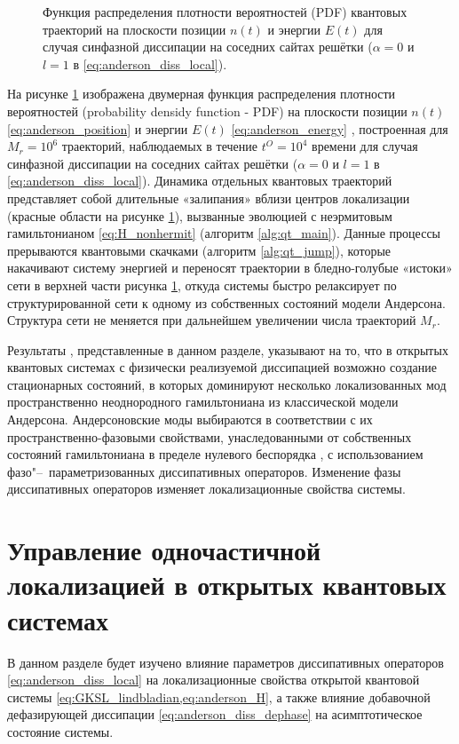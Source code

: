 \begin{figure}[ht]
	\caption[Плотность вероятностей квантовых траекторий на плоскости позиции и энергий в случае  локализации Андерсона]{
		Функция распределения плотности вероятностей (PDF) квантовых траекторий на плоскости позиции \(n(t)\) и энергии \(E(t)\) для случая синфазной диссипации на соседних сайтах решётки (\(\alpha=0\) и \(l=1\) в \cref{eq:anderson_diss_local}).
	}
	\label{fig:anderson_qj_1}
\end{figure}

На рисунке \cref{fig:anderson_qj_1} изображена двумерная функция распределения плотности вероятностей (probability densidy function - PDF) на плоскости позиции \(n(t)\) \cref{eq:anderson_position} и энергии \(E(t)\) \cref{eq:anderson_energy} , построенная для \(M_r=10^6\) траекторий, наблюдаемых в течение \(t^O=10^4\) времени для случая синфазной диссипации на соседних сайтах решётки (\(\alpha=0\) и \(l=1\) в \cref{eq:anderson_diss_local}). Динамика отдельных квантовых траекторий представляет собой длительные «залипания» вблизи центров локализации (красные области на рисунке \cref{fig:anderson_qj_1}), вызванные эволюцией с неэрмитовым гамильтонианом \cref{eq:H_nonhermit} (алгоритм \ref{alg:qt_main}). Данные процессы прерываются квантовыми скачками (алгоритм \ref{alg:qt_jump}), которые накачивают систему энергией и переносят траектории в бледно-голубые «истоки» сети в верхней части рисунка \cref{fig:anderson_qj_1}, откуда системы быстро релаксирует по структурированной сети к одному из собственных состояний модели Андерсона. Структура сети не меняется при дальнейшем увеличении числа траекторий \(M_r\).

Результаты \cite{Yusipov2017}, представленные в данном разделе, указывают на то, что в открытых квантовых системах с физически реализуемой диссипацией возможно создание стационарных состояний, в которых доминируют несколько локализованных мод пространственно неоднородного гамильтониана из классической модели Андерсона. Андерсоновские моды выбираются в соответствии с их пространственно-фазовыми свойствами, унаследованными от собственных состояний гамильтониана в пределе нулевого беспорядка \cite{Ishii1973}, с использованием фазо"--~параметризованных диссипативных операторов. Изменение фазы диссипативных операторов изменяет локализационные свойства системы.

\section{Управление одночастичной локализацией в открытых квантовых системах}\label{sec:ch2/epjb}
В данном разделе будет изучено влияние параметров диссипативных операторов \cref{eq:anderson_diss_local} на локализационные свойства открытой квантовой системы \cref{eq:GKSL_lindbladian,eq:anderson_H}, а также влияние добавочной дефазирующей диссипации \cref{eq:anderson_diss_dephase} на асимптотическое состояние системы.

